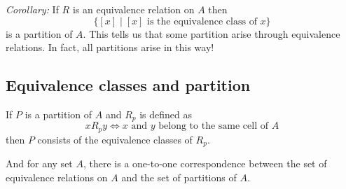 \documentclass[11pt]{article}
\begin{document}
    \emph{Corollary:} If $R$ is an equivalence relation on $A$ then \[\{[x] \mid [x] \text{ is the equivalence class of } x\}\] is a partition of $A$. This tells us that some partition arise through equivalence relations. In fact, all partitions arise in this way!


    \subsection{Equivalence classes and partition}

    If $P$ is a partition of $A$ and \(R_p\) is defined as \[x R_p y \Leftrightarrow x \text{ and } y \text{ belong to the same cell of } A\] then $P$ consists of the equivalence classes of \(R_p\). 

    And for any set $A$, there is a one-to-one correspondence between the set of equivalence relations on $A$ and the set of partitions of $A$.
\end{document}
